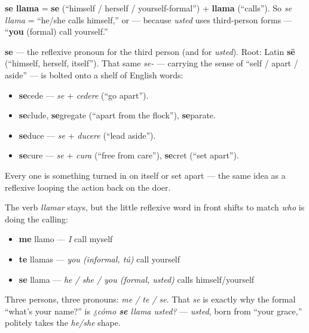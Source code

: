 \begin{cousinweb}
\textbf{se llama} = \textbf{se} (\textquotedblleft{}himself / herself / yourself-formal\textquotedblright{}) + \textbf{llama} (\textquotedblleft{}calls\textquotedblright{}). So \emph{se llama} = \textquotedblleft{}he/she calls himself,\textquotedblright{} or — because \emph{usted} uses third-person forms — \textquotedblleft{}\textbf{you} (formal) call yourself.\textquotedblright{}

\textbf{se} — the reflexive pronoun for the third person (and for \emph{usted}). Root: Latin \textbf{sē} (\textquotedblleft{}himself, herself, itself\textquotedblright{}). That same \emph{se-} — carrying the sense of \textquotedblleft{}self / apart / aside\textquotedblright{} — is bolted onto a shelf of English words:

\begin{itemize}
\raggedright
  \item \textbf{se}cede — \emph{se} + \emph{cedere} (\textquotedblleft{}go apart\textquotedblright{}).
  \item \textbf{se}clude, \textbf{se}gregate (\textquotedblleft{}apart from the flock\textquotedblright{}), \textbf{se}parate.
  \item \textbf{se}duce — \emph{se} + \emph{ducere} (\textquotedblleft{}lead aside\textquotedblright{}).
  \item \textbf{se}cure — \emph{se} + \emph{cura} (\textquotedblleft{}free from care\textquotedblright{}), \textbf{se}cret (\textquotedblleft{}set apart\textquotedblright{}).
\end{itemize}

Every one is something turned in on itself or set apart — the same idea as a reflexive looping the action back on the doer.
\end{cousinweb}

\begin{grammarlens}[title={Grammar Lens: the reflexive pronoun changes with the person}]
The verb \emph{llamar} stays, but the little reflexive word in front shifts to match \emph{who} is doing the calling:

\begin{itemize}
\raggedright
  \item \textbf{me} llamo — \emph{I} call myself
  \item \textbf{te} llamas — \emph{you (informal, tú)} call yourself
  \item \textbf{se} llama — \emph{he / she / you (formal, usted)} calls himself/yourself
\end{itemize}

Three persons, three pronouns: \emph{me / te / se}. That \emph{se} is exactly why the formal \textquotedblleft{}what's your name?\textquotedblright{} is \emph{¿cómo \textbf{se} llama usted?} — \emph{usted}, born from \textquotedblleft{}your grace,\textquotedblright{} politely takes the \emph{he/she} shape.
\end{grammarlens}

